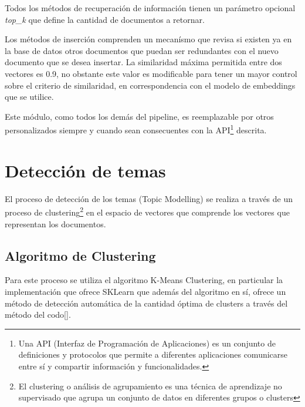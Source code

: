         Todos los métodos de recuperación de información tienen un parámetro opcional \emph{top_k} que define la cantidad de documentos a retornar.

        Los métodos de inserción comprenden un mecanísmo que revisa si existen ya en la base de datos otros documentos que puedan ser redundantes con el nuevo documento que se desea insertar. La similaridad máxima permitida entre dos vectores es 0.9, no obstante este valor es modificable para tener un mayor control sobre el criterio de similaridad, en correspondencia con el modelo de embeddings que se utilice.

        Este módulo, como todos los demás del pipeline, es reemplazable por otros personalizados siempre y cuando sean consecuentes con la API\footnote{Una API (Interfaz de Programación de Aplicaciones) es un conjunto de definiciones y protocolos que permite a diferentes aplicaciones comunicarse entre sí y compartir información y funcionalidades.} descrita.

\section{Detección de temas}
    El proceso de detección de los temas (Topic Modelling) se realiza a través de un proceso de clustering\footnote{El clustering o análisis de agrupamiento es una técnica de aprendizaje no supervisado que agrupa un conjunto de datos en diferentes grupos o clusters} en el espacio de vectores que comprende los vectores que representan los documentos.

    \subsection{Algoritmo de Clustering}
        Para este proceso se utiliza el algoritmo K-Means Clustering, en particular la implementación que ofrece SKLearn\cite{sklearn} que además del algoritmo en sí, ofrece un método de detección automática de la cantidad óptima de clusters a través del método del codo[\cite{elbow}].
    
